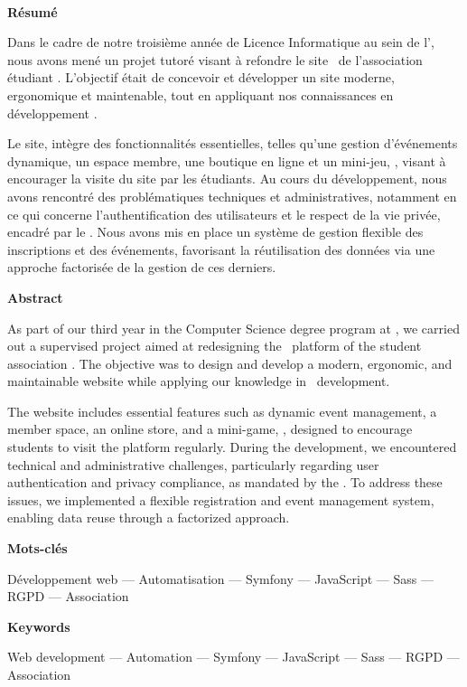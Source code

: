 \pagebreak
\thispagestyle{empty}
~
\bigskip
\bigskip
\bigskip
\bigskip

\Large{\textbf{Résumé}}\normalsize
\label{chap:abstract-fr}
\bigskip

Dans le cadre de notre troisième année de Licence Informatique au sein de l’\univ, nous avons mené un projet tutoré visant à refondre le site \web\ de l’association étudiant . L’objectif était de concevoir et développer un site moderne, ergonomique et maintenable, tout en appliquant nos connaissances en développement \web.

Le site, intègre des fonctionnalités essentielles, telles qu’une gestion d’événements dynamique, un espace membre, une boutique en ligne et un mini-jeu, \game, visant à encourager la visite du site par les étudiants. Au cours du développement, nous avons rencontré des problématiques techniques et administratives, notamment en ce qui concerne l’authentification des utilisateurs et le respect de la vie privée, encadré par le . Nous avons mis en place un système de gestion flexible des inscriptions et des événements, favorisant la réutilisation des données via une approche factorisée de la gestion de ces derniers.
\bigskip
\bigskip


\Large{\textbf{Abstract}}\normalsize
\label{chap:abstract-en}
\bigskip

As part of our third year in the Computer Science degree program at \univ, we carried out a supervised project aimed at redesigning the \web\ platform of the student association . The objective was to design and develop a modern, ergonomic, and maintainable website while applying our knowledge in \web\ development.

The website includes essential features such as dynamic event management, a member space, an online store, and a mini-game, \game, designed to encourage students to visit the platform regularly. During the development, we encountered technical and administrative challenges, particularly regarding user authentication and privacy compliance, as mandated by the . To address these issues, we implemented a flexible registration and event management system, enabling data reuse through a factorized approach.
\bigskip
\bigskip


\large{\textbf{Mots-clés}}\normalsize
\bigskip


\noindent Développement web --- Automatisation --- Symfony --- JavaScript --- Sass --- RGPD --- Association
\bigskip
\bigskip

\large{\textbf{Keywords}}\normalsize
\bigskip



\noindent Web development --- Automation --- Symfony --- JavaScript --- Sass --- RGPD --- Association
